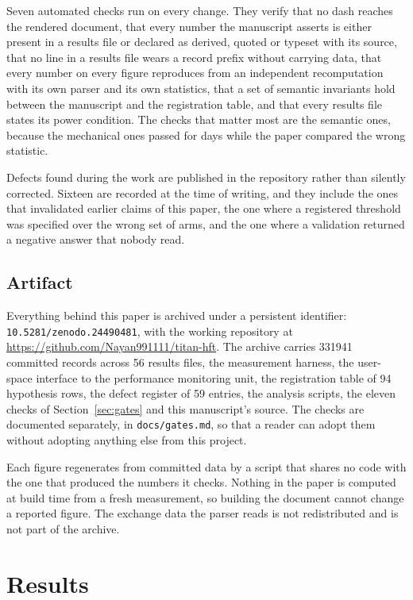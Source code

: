 \documentclass[conference]{IEEEtran}
\begin{document}
Seven automated checks run on every change. They verify that no dash reaches the
rendered document, that every number the manuscript asserts is either present in
a results file or declared as derived, quoted or typeset with its source, that
no line in a results file wears a record prefix without carrying data, that
every number on every figure reproduces from an independent recomputation with
its own parser and its own statistics, that a set of semantic invariants hold
between the manuscript and the registration table, and that every results file
states its power condition. The checks that matter most are the semantic ones,
because the mechanical ones passed for days while the paper compared the wrong
statistic.

Defects found during the work are published in the repository rather than
silently corrected. Sixteen are recorded at the time of writing, and they
include the ones that invalidated earlier claims of this paper, the one where a
registered threshold was specified over the wrong set of arms, and the one where
a validation returned a negative answer that nobody read.

\subsection{Artifact}

Everything behind this paper is archived under a persistent identifier:
\texttt{10.5281/zenodo.24490481}, with the working repository at
\url{https://github.com/Nayan991111/titan-hft}. The archive carries 331941
committed records across 56 results files, the measurement harness, the
user-space interface to the performance monitoring unit, the registration
table of 94 hypothesis rows, the defect register of 59 entries, the analysis
scripts, the eleven checks of Section~\ref{sec:gates} and this manuscript's
source. The checks are documented separately, in \texttt{docs/gates.md}, so
that a reader can adopt them without adopting anything else from this project.

Each figure regenerates from committed data by a script that shares no code
with the one that produced the numbers it checks. Nothing in the paper is
computed at build time from a fresh measurement, so building the document
cannot change a reported figure. The exchange data the parser reads is not
redistributed and is not part of the archive.

\section{Results}
\end{document}

